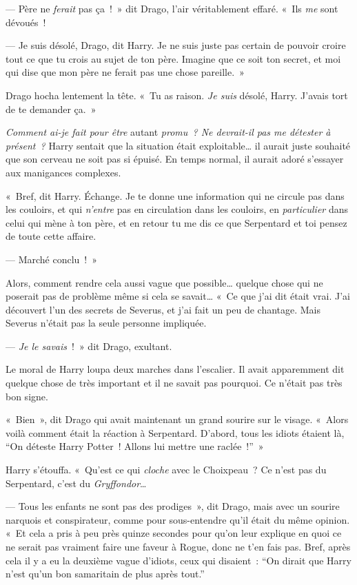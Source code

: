 --- Père ne \emph{ferait} pas ça~!~»
dit Drago, l'air véritablement effaré.
«~Ils \emph{me} sont dévoués~!

--- Je suis désolé, Drago, dit Harry.
Je ne suis juste pas certain de pouvoir croire tout ce que tu crois au sujet de ton père.
Imagine que ce soit ton secret, et moi qui dise que mon père ne ferait pas une chose pareille.~»

Drago hocha lentement la tête.
«~Tu as raison.
\emph{Je suis} désolé, Harry.
J'avais tort de te demander ça.~»

\emph{Comment ai-je fait pour être} autant \emph{promu~?
Ne devrait-il pas me détester à présent~?}
Harry sentait que la situation était exploitable… il aurait juste souhaité que son cerveau ne soit pas si épuisé.
En temps normal, il aurait adoré s'essayer aux manigances complexes.

«~Bref, dit Harry. Échange.
Je te donne une information qui ne circule pas dans les couloirs, et qui \emph{n'entre} pas en circulation dans les couloirs, en \emph{particulier} dans celui qui mène à ton père, et en retour tu me dis ce que Serpentard et toi pensez de toute cette affaire.

--- Marché conclu~!~»

Alors, comment rendre cela aussi vague que possible… quelque chose qui ne poserait pas de problème même si cela se savait…
«~Ce que j'ai dit était vrai.
J'ai découvert l'un des secrets de Severus, et j'ai fait un peu de chantage.
Mais Severus n'était pas la seule personne impliquée.

--- \emph{Je le savais}~!~» dit Drago, exultant.

Le moral de Harry loupa deux marches dans l'escalier.
Il avait apparemment dit quelque chose de très important et il ne savait pas pourquoi.
Ce n'était pas très bon signe.

«~Bien~», dit Drago qui avait maintenant un grand sourire sur le visage.
«~Alors voilà comment était la réaction à Serpentard.
D'abord, tous les idiots étaient là, “On déteste Harry Potter~!
Allons lui mettre une raclée~!”~»

Harry s'étouffa.
«~Qu'est ce qui \emph{cloche} avec le Choixpeau~?
Ce n'est pas du Serpentard, c'est du \emph{Gryffondor}…

--- Tous les enfants ne sont pas des prodiges~», dit Drago, mais avec un sourire narquois et conspirateur, comme pour sous-entendre qu'il était du même opinion.
«~Et cela a pris à peu près quinze secondes pour qu'on leur explique en quoi ce ne serait pas vraiment faire une faveur à Rogue, donc ne t'en fais pas.
Bref, après cela il y a eu la deuxième vague d'idiots, ceux qui disaient~: “On dirait que Harry n'est qu'un bon samaritain de plus après tout.”


